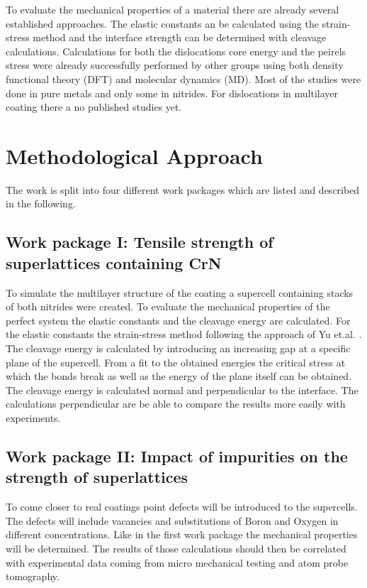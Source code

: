 \documentclass[12pt]{scrartcl}
\begin{document}
To evaluate the mechanical properties of a material there are already several established approaches. The elastic constants an be calculated using the strain-stress method and the interface strength can be determined with cleavage calculations\cite{Rehak2017}. 
Calculations for both the dislocations core energy and the peirels stress were already successfully performed by other groups using both density functional theory (DFT) and molecular dynamics (MD). Most of the studies were done in pure metals and only some in nitrides\cite{Lu2000}. For dislocations in multilayer coating there a no published studies yet.


\section{Methodological Approach}

The work is split into four different work packages which are listed and described in the following. 

\subsection{Work package I: Tensile strength of superlattices containing CrN}
To simulate the multilayer structure of the coating a supercell containing stacks of both nitrides were created. To evaluate the mechanical properties of the perfect system the elastic constants and the cleavage energy are calculated. For the elastic constants the strain-stress method following the approach of Yu et.al. \cite{Yu2010}. The cleavage energy is calculated by introducing an increasing gap at a specific plane of the supercell. From a fit to the obtained energies the critical stress at which the bonds break as well as the energy of the plane itself can be obtained. The cleavage energy is calculated normal and perpendicular to the interface. The calculations perpendicular are be able to compare the results more easily with experiments.  

\subsection{Work package II:  Impact of impurities on the strength of superlattices}
To come closer to real coatings point defects will be introduced to the supercells. The defects will include vacancies and substitutions of Boron and Oxygen in different concentrations. Like in the first work package the mechanical properties will be determined. The results of those calculations should then be correlated with experimental data coming from micro mechanical testing and atom probe tomography.
\end{document}
